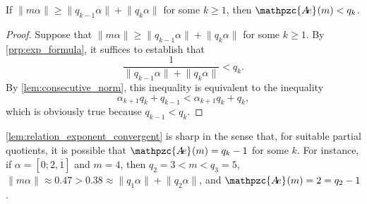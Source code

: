 \documentclass[a4paper,fleqn]{article}
\providecommand{\norm}[1]{\lVert#1\rVert}
\newcommand{\abexp}[2][]{\mathpzc{A\mkern-3mu e}_{#1}(#2)}
\begin{document}
  \begin{lemma}\label{lem:relation_exponent_convergent}
    If $\norm{m\alpha} \geq \norm{q_{k-1}\alpha} + \norm{q_k\alpha}$ for some $k \geq 1$, then $\abexp{m} < q_k$.
  \end{lemma}
  \begin{proof}
    Suppose that $\norm{m\alpha} \geq \norm{q_{k-1}\alpha} + \norm{q_k\alpha}$ for some $k \geq 1$. By
    \autoref{prp:exp_formula}, it suffices to establish that
    \begin{equation*}
      \frac{1}{\norm{q_{k-1}\alpha} + \norm{q_k \alpha}} < q_k.
    \end{equation*}
    By \autoref{lem:consecutive_norm}, this inequality is equivalent to the inequality
    \begin{equation*}
      \alpha_{k+1}q_k + q_{k-1} < \alpha_{k+1}q_k + q_k,
    \end{equation*}
    which is obviously true because $q_{k-1} < q_k$.
  \end{proof}

  \autoref{lem:relation_exponent_convergent} is sharp in the sense that, for suitable partial quotients, it is possible
  that $\abexp{m} = q_k - 1$ for some $k$. For instance, if $\alpha = [0; 2, \overline{1}]$ and $m = 4$, then
  $q_2 = 3 < m < q_3 = 5$, $\norm{m\alpha} \approx 0.47 > 0.38 \approx \norm{q_1\alpha} + \norm{q_2\alpha}$, and
  $\abexp{m} = 2 = q_2 - 1$.
\end{document}
